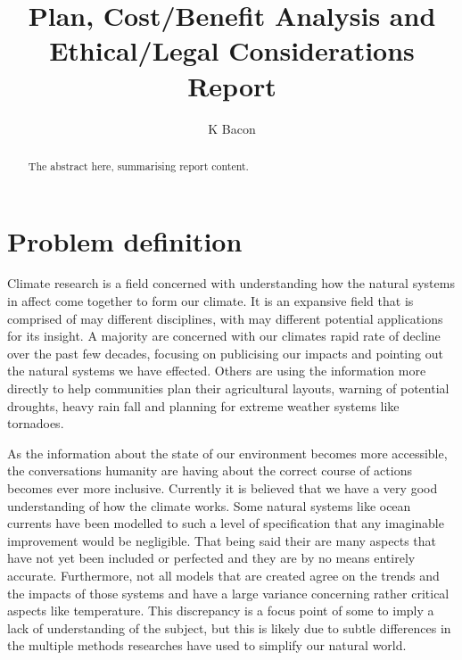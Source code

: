 \documentclass{ecmm427_assignment}
\begin{document}
\tableofcontents

\title{Plan, Cost/Benefit Analysis and Ethical/Legal Considerations Report}
\author{K Bacon}
\maketitle

\begin{abstract}
The abstract here, summarising report content. \blindtext
\end{abstract}

\declaration
\newpage %

\section{Problem definition}

Climate research is a field concerned with understanding how the natural systems in affect come together to form our climate. It is an expansive field that is comprised of may different disciplines, with may different potential applications for its insight. A majority are concerned with our climates rapid rate of decline over the past few decades, focusing on publicising our impacts and pointing out the natural systems we have effected. Others are using the information more directly to help communities plan their agricultural layouts, warning of potential droughts, heavy rain fall and planning for extreme weather systems like tornadoes.

As the information about the state of our environment becomes more accessible, the conversations humanity are having about the correct course of actions becomes ever more inclusive. Currently it is believed that we have a very good understanding of how the climate works. Some natural systems like ocean currents have been modelled to such a level of specification that any imaginable improvement would be negligible. That being said their are many aspects that have not yet been included or perfected and they are by no means entirely accurate. Furthermore, not all models that are created agree on the trends and the impacts of those systems and have a large variance concerning rather critical aspects like temperature. This discrepancy is a focus point of some to imply a lack of understanding of the subject, but this is likely due to subtle differences in the multiple methods researches have used to simplify our natural world. \\
\end{document}
